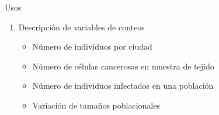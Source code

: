 \documentclass[
  11pt,
  ignorenonframetext,
]{beamer}
\providecommand{\tightlist}{%
  \setlength{\itemsep}{0pt}\setlength{\parskip}{0pt}}
\begin{document}
\begin{frame}{Usos}
\protect\hypertarget{usos-1}{}
\begin{enumerate}
\item
  Descripción de variables de conteos

  \begin{itemize}
  \tightlist
  \item
    Número de individuos por ciudad
  \item
    Número de células cancerosas en muestra de tejido
  \item
    Número de individuos infectados en una población
  \item
    Variación de tamaños poblacionales
  \end{itemize}
\end{enumerate}
\end{frame}
\end{document}
